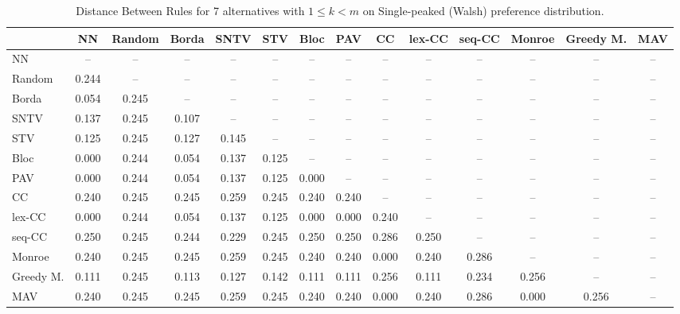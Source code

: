 
\begin{table*}
\centering
\begin{tabular}{lccccccccccccc}
\toprule
 & NN & Random & Borda & SNTV & STV & Bloc & PAV & CC & lex-CC & seq-CC & Monroe & Greedy M. & MAV \\
\midrule
NN & -- & -- & -- & -- & -- & -- & -- & -- & -- & -- & -- & -- & -- \\
Random & 0.244 & -- & -- & -- & -- & -- & -- & -- & -- & -- & -- & -- & -- \\
Borda & 0.054 & 0.245 & -- & -- & -- & -- & -- & -- & -- & -- & -- & -- & -- \\
SNTV & 0.137 & 0.245 & 0.107 & -- & -- & -- & -- & -- & -- & -- & -- & -- & -- \\
STV & 0.125 & 0.245 & 0.127 & 0.145 & -- & -- & -- & -- & -- & -- & -- & -- & -- \\
Bloc & 0.000 & 0.244 & 0.054 & 0.137 & 0.125 & -- & -- & -- & -- & -- & -- & -- & -- \\
PAV & 0.000 & 0.244 & 0.054 & 0.137 & 0.125 & 0.000 & -- & -- & -- & -- & -- & -- & -- \\
CC & 0.240 & 0.245 & 0.245 & 0.259 & 0.245 & 0.240 & 0.240 & -- & -- & -- & -- & -- & -- \\
lex-CC & 0.000 & 0.244 & 0.054 & 0.137 & 0.125 & 0.000 & 0.000 & 0.240 & -- & -- & -- & -- & -- \\
seq-CC & 0.250 & 0.245 & 0.244 & 0.229 & 0.245 & 0.250 & 0.250 & 0.286 & 0.250 & -- & -- & -- & -- \\
Monroe & 0.240 & 0.245 & 0.245 & 0.259 & 0.245 & 0.240 & 0.240 & 0.000 & 0.240 & 0.286 & -- & -- & -- \\
Greedy M. & 0.111 & 0.245 & 0.113 & 0.127 & 0.142 & 0.111 & 0.111 & 0.256 & 0.111 & 0.234 & 0.256 & -- & -- \\
MAV & 0.240 & 0.245 & 0.245 & 0.259 & 0.245 & 0.240 & 0.240 & 0.000 & 0.240 & 0.286 & 0.000 & 0.256 & -- \\
\bottomrule
\end{tabular}

\caption{Distance Between Rules for 7 alternatives with $1 \leq k < m$ on Single-peaked (Walsh) preference distribution.}
\end{table*}
